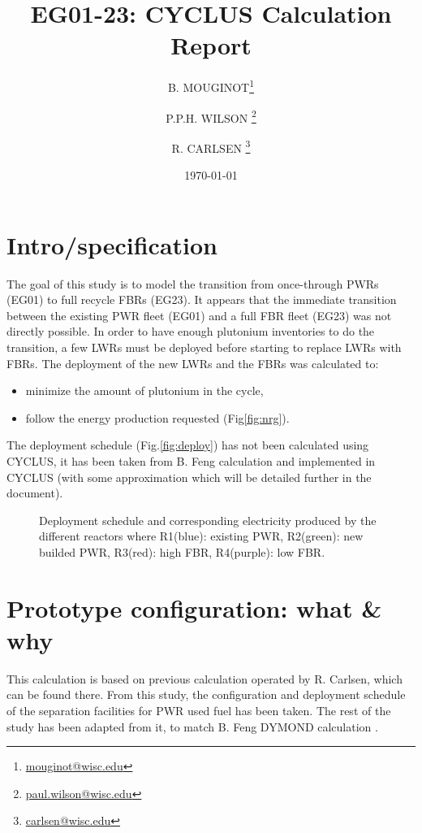 \documentclass[12pt]{article}
\title{EG01-23: CYCLUS Calculation Report}
\author[1]{B. MOUGINOT\thanks{\href{mailto:mouginot@wisc.edu}{mouginot@wisc.edu}}}
\author[1]{P.P.H. WILSON \thanks{\href{mailto:paul.wilson@wisc.edu}{paul.wilson@wisc.edu}}}
\author[1]{R. CARLSEN \thanks{\href{mailto:carlsen@wisc.edu}{carlsen@wisc.edu}}}
\affil[1]{University of Wisconsin-Madison, Department of Engineering Physics, CNERG group}
\date{\today}
\begin{document}
\maketitle

\section{Intro/specification}
The goal of this study is to model the transition
from once-through PWRs (EG01) to full recycle FBRs
(EG23). It appears that the immediate transition
between the existing PWR fleet (EG01) and a full
FBR fleet (EG23) was not directly possible. In
order to have enough plutonium inventories to do
the transition, a few LWRs must be deployed before
starting to replace LWRs with FBRs. The deployment
of the new LWRs and the FBRs was calculated to:
\begin{itemize}
\item minimize the amount of plutonium in the cycle,
\item follow the energy production requested (Fig\ref{fig:nrg}).
\end{itemize}
The deployment schedule (Fig.\ref{fig:deploy}) has not been
calculated using CYCLUS, it has been taken from B.
Feng calculation and implemented in CYCLUS (with
some approximation which will be detailed further
in the document).

\begin{figure}[h!]
\centering
{}
\caption{Deployment schedule and corresponding
electricity produced by the different reactors
where R1(blue): existing PWR, R2(green): new
builded PWR, R3(red): high FBR, R4(purple): low
FBR.\label{fig:deployment} }
\end{figure}


\pagebreak
\section{Prototype configuration: what \& why}
This calculation is based on previous calculation
operated by R. Carlsen, which can be found there.
From this study, the configuration and deployment
schedule of the separation facilities for PWR used
fuel has been taken. The rest of the study has
been adapted from it, to match B. Feng DYMOND
calculation \cite{B.Feng_calculation}.
\end{document}
